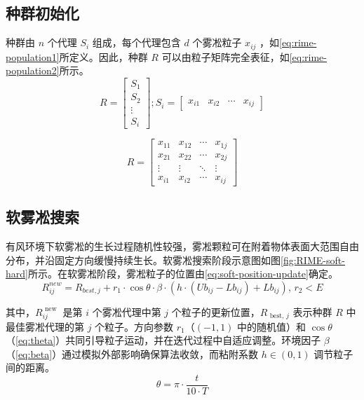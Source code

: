 \documentclass{wzuthesis}
\begin{document}
\subsection{种群初始化}
种群由 $n$ 个代理 ${S}_{i}$ 组成，每个代理包含 $d$ 个雾凇粒子 ${x}_{ij}$ ，如\ref{eq:rime-population1}所定义。因此，种群 $R$ 可以由粒子矩阵完全表征，如\ref{eq:rime-population2}所示。
\begin{equation}
R = \begin{bmatrix} S_1 \\ S_2 \\ \vdots \\ S_i \end{bmatrix}; S_i = \begin{bmatrix} x_{i1} & x_{i2} & \cdots & x_{ij} \end{bmatrix}
\label{eq:rime-population1}
\end{equation}

\begin{equation}
R = \begin{bmatrix} x_{11} & x_{12} & \cdots & x_{1j} \\ x_{21} & x_{22} & \cdots & x_{2j} \\ \vdots & \vdots & \ddots & \vdots \\ x_{i1} & x_{i2} & \cdots & x_{ij} \end{bmatrix}
\label{eq:rime-population2}
\end{equation}

\subsection{软雾凇搜索}
有风环境下软雾凇的生长过程随机性较强，雾凇颗粒可在附着物体表面大范围自由分布，并沿固定方向缓慢持续生长。软雾凇搜索阶段示意图如图\ref{fig:RIME-soft-hard}所示。在软雾凇阶段，雾凇粒子的位置由\ref{eq:soft-position-update}确定。
\begin{equation}
R_{ij}^{new} = R_{best,j} + r_1 \cdot \cos{\theta} \cdot \beta \cdot \left( h \cdot (Ub_{ij} - Lb_{ij}) + Lb_{ij} \right), \, r_2 < E
\label{eq:soft-position-update}
\end{equation}

其中，${R}_{ij}^{\text{ new }}$ 是第 $i$ 个雾凇代理中第 $j$ 个粒子的更新位置，${R}_{\text{ best, }j}$ 表示种群 $R$ 中最佳雾凇代理的第 $j$ 个粒子。方向参数 ${r}_{1}$（$\left( {-1,1}\right)$ 中的随机值）和 $\cos \theta$（\ref{eq:theta}）共同引导粒子运动，并在迭代过程中自适应调整。环境因子 $\beta$（\ref{eq:beta}）通过模拟外部影响确保算法收敛，而粘附系数 $h \in  \left( {0,1}\right)$ 调节粒子间的距离。
\begin{equation}
\theta = \pi \cdot \frac{t}{10 \cdot T}
\label{eq:theta}
\end{equation}
\end{document}
